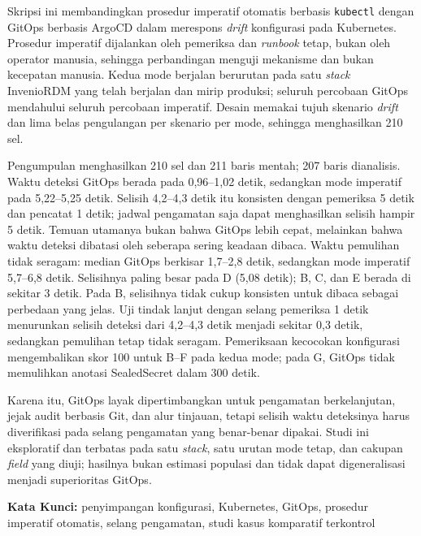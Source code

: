 \documentclass[skripsi,indonesia]{ugmskripsi}
\begin{document}
\cover
\titlepageind
\approvalpage
\declarepage

\tableofcontents
\clearpage
{}
{}
\listoftables
\clearpage
{}
{}
\listoffigures
\lambang

\abstractind
Skripsi ini membandingkan prosedur imperatif otomatis berbasis \texttt{kubectl} dengan GitOps berbasis ArgoCD dalam merespons \textit{drift} konfigurasi pada Kubernetes. Prosedur imperatif dijalankan oleh pemeriksa dan \textit{runbook} tetap, bukan oleh operator manusia, sehingga perbandingan menguji mekanisme dan bukan kecepatan manusia. Kedua mode berjalan berurutan pada satu \textit{stack} InvenioRDM yang telah berjalan dan mirip produksi; seluruh percobaan GitOps mendahului seluruh percobaan imperatif. Desain memakai tujuh skenario \textit{drift} dan lima belas pengulangan per skenario per mode, sehingga menghasilkan 210 sel.

Pengumpulan menghasilkan 210 sel dan 211 baris mentah; 207 baris dianalisis. Waktu deteksi GitOps berada pada 0,96--1,02 detik, sedangkan mode imperatif pada 5,22--5,25 detik. Selisih 4,2--4,3 detik itu konsisten dengan pemeriksa 5 detik dan pencatat 1 detik; jadwal pengamatan saja dapat menghasilkan selisih hampir 5 detik. Temuan utamanya bukan bahwa GitOps lebih cepat, melainkan bahwa waktu deteksi dibatasi oleh seberapa sering keadaan dibaca. Waktu pemulihan tidak seragam: median GitOps berkisar 1,7--2,8 detik, sedangkan mode imperatif 5,7--6,8 detik. Selisihnya paling besar pada D (5,08 detik); B, C, dan E berada di sekitar 3 detik. Pada B, selisihnya tidak cukup konsisten untuk dibaca sebagai perbedaan yang jelas. Uji tindak lanjut dengan selang pemeriksa 1 detik menurunkan selisih deteksi dari 4,2--4,3 detik menjadi sekitar 0,3 detik, sedangkan pemulihan tetap tidak seragam. Pemeriksaan kecocokan konfigurasi mengembalikan skor 100 untuk B--F pada kedua mode; pada G, GitOps tidak memulihkan anotasi SealedSecret dalam 300 detik.

Karena itu, GitOps layak dipertimbangkan untuk pengamatan berkelanjutan, jejak audit berbasis Git, dan alur tinjauan, tetapi selisih waktu deteksinya harus diverifikasi pada selang pengamatan yang benar-benar dipakai. Studi ini eksploratif dan terbatas pada satu \textit{stack}, satu urutan mode tetap, dan cakupan \textit{field} yang diuji; hasilnya bukan estimasi populasi dan tidak dapat digeneralisasi menjadi superioritas GitOps.
\par\vspace{0.1cm}
\noindent\textbf{Kata Kunci:} penyimpangan konfigurasi, Kubernetes, GitOps, prosedur imperatif otomatis, selang pengamatan, studi kasus komparatif terkontrol
\endabstractind
\end{document}
